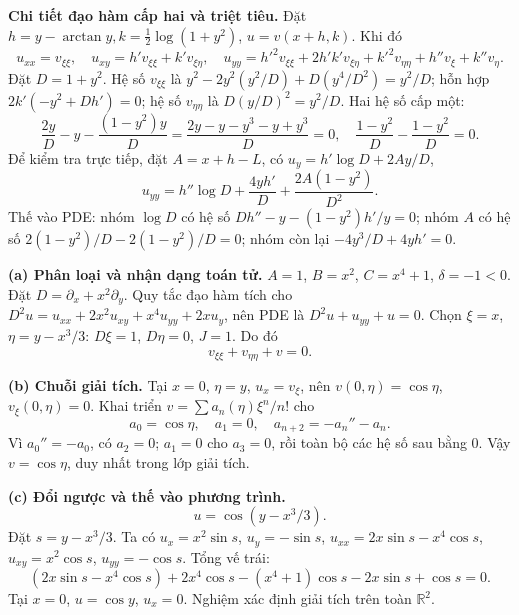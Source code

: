 \textbf{Chi tiết đạo hàm cấp hai và triệt tiêu.} Đặt $h=y-\arctan y,k=\frac12\log(1+y^2)$, $u=v(x+h,k)$. Khi đó
\[u_{xx}=v_{\xi\xi},\quad u_{xy}=h'v_{\xi\xi}+k'v_{\xi\eta},\quad
u_{yy}=h'^2v_{\xi\xi}+2h'k'v_{\xi\eta}+k'^2v_{\eta\eta}+h''v_\xi+k''v_\eta.\]
Đặt $D=1+y^2$. Hệ số $v_{\xi\xi}$ là $y^2-2y^2(y^2/D)+D(y^4/D^2)=y^2/D$; hỗn hợp $2k'(-y^2+Dh')=0$; hệ số $v_{\eta\eta}$ là $D(y/D)^2=y^2/D$. Hai hệ số cấp một:
\[\frac{2y}D-y-\frac{(1-y^2)y}D
=\frac{2y-y-y^3-y+y^3}D=0,\quad
\frac{1-y^2}D-\frac{1-y^2}D=0.\]
Để kiểm tra trực tiếp, đặt $A=x+h-L$, có $u_y=h'\log D+2Ay/D$,
\[u_{yy}=h''\log D+\frac{4yh'}D+\frac{2A(1-y^2)}{D^2}.\]
Thế vào PDE: nhóm $\log D$ có hệ số $Dh''-y-(1-y^2)h'/y=0$; nhóm $A$ có hệ số $2(1-y^2)/D-2(1-y^2)/D=0$; nhóm còn lại $-4y^3/D+4yh'=0$.

\textbf{(a) Phân loại và nhận dạng toán tử.} $A=1$, $B=x^2$, $C=x^4+1$, $\delta=-1<0$. Đặt $D=\partial_x+x^2\partial_y$. Quy tắc đạo hàm tích cho $D^2u=u_{xx}+2x^2u_{xy}+x^4u_{yy}+2xu_y$, nên PDE là $D^2u+u_{yy}+u=0$. Chọn $\xi=x$, $\eta=y-x^3/3$: $D\xi=1$, $D\eta=0$, $J=1$. Do đó
\[\boxed{v_{\xi\xi}+v_{\eta\eta}+v=0.}\]

\textbf{(b) Chuỗi giải tích.} Tại $x=0$, $\eta=y$, $u_x=v_\xi$, nên $v(0,\eta)=\cos\eta$, $v_\xi(0,\eta)=0$. Khai triển $v=\sum a_n(\eta)\xi^n/n!$ cho
\[a_0=\cos\eta,\quad a_1=0,\quad a_{n+2}=-a_n''-a_n.\]
Vì $a_0''=-a_0$, có $a_2=0$; $a_1=0$ cho $a_3=0$, rồi toàn bộ các hệ số sau bằng $0$. Vậy $v=\cos\eta$, duy nhất trong lớp giải tích.

\textbf{(c) Đổi ngược và thế vào phương trình.}
\[\boxed{u=\cos(y-x^3/3).}\]
Đặt $s=y-x^3/3$. Ta có $u_x=x^2\sin s$, $u_y=-\sin s$, $u_{xx}=2x\sin s-x^4\cos s$, $u_{xy}=x^2\cos s$, $u_{yy}=-\cos s$. Tổng vế trái:
\[(2x\sin s-x^4\cos s)+2x^4\cos s-(x^4+1)\cos s-2x\sin s+\cos s=0.\]
Tại $x=0$, $u=\cos y$, $u_x=0$. Nghiệm xác định giải tích trên toàn $\mathbb R^2$.
